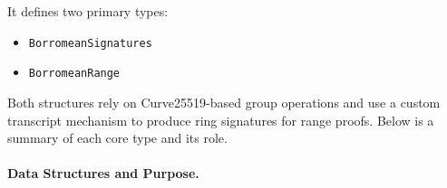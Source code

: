 \documentclass[12pt,a4paper]{article}
\begin{document}
It defines two primary types: 
\begin{itemize}
  \item \texttt{BorromeanSignatures}%
  \item \texttt{BorromeanRange}
\end{itemize}

Both structures rely on Curve25519-based group operations and use a custom transcript mechanism to produce ring signatures for range proofs. 
Below is a summary of each core type and its role.

\paragraph{Data Structures and Purpose.}
\end{document}
